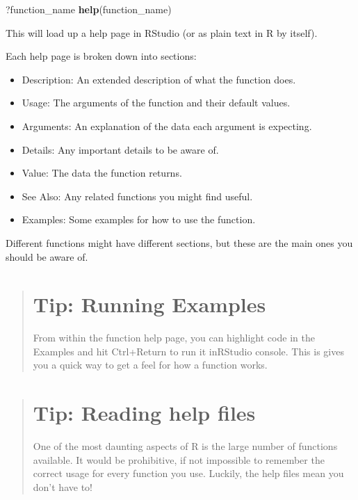 \documentclass[]{book}
\newenvironment{Shaded}{\begin{snugshade}}{\end{snugshade}}
\newcommand{\KeywordTok}[1]{\textcolor[rgb]{0.13,0.29,0.53}{\textbf{#1}}}
\newcommand{\NormalTok}[1]{#1}
\providecommand{\tightlist}{%
  \setlength{\itemsep}{0pt}\setlength{\parskip}{0pt}}
\begin{document}
\begin{Shaded}
\begin{Highlighting}[]
\NormalTok{?function_name}
\KeywordTok{help}\NormalTok{(function_name)}
\end{Highlighting}
\end{Shaded}

This will load up a help page in RStudio (or as plain text in R by
itself).

Each help page is broken down into sections:

\begin{itemize}
\tightlist
\item
  Description: An extended description of what the function does.
\item
  Usage: The arguments of the function and their default values.
\item
  Arguments: An explanation of the data each argument is expecting.
\item
  Details: Any important details to be aware of.
\item
  Value: The data the function returns.
\item
  See Also: Any related functions you might find useful.
\item
  Examples: Some examples for how to use the function.
\end{itemize}

Different functions might have different sections, but these are the
main ones you should be aware of.

\begin{quote}
\section{Tip: Running Examples}\label{tip-running-examples}

From within the function help page, you can highlight code in the
Examples and hit Ctrl+Return to run it inRStudio console. This is gives
you a quick way to get a feel for how a function works.
\end{quote}

\begin{quote}
\section{Tip: Reading help files}\label{tip-reading-help-files}

One of the most daunting aspects of R is the large number of functions
available. It would be prohibitive, if not impossible to remember the
correct usage for every function you use. Luckily, the help files mean
you don't have to!
\end{quote}
\end{document}
